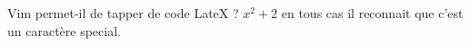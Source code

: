 Vim permet-il de tapper de code LateX ?
$x^2+2$
en tous cas il reconnait que c'est un caractère special.
